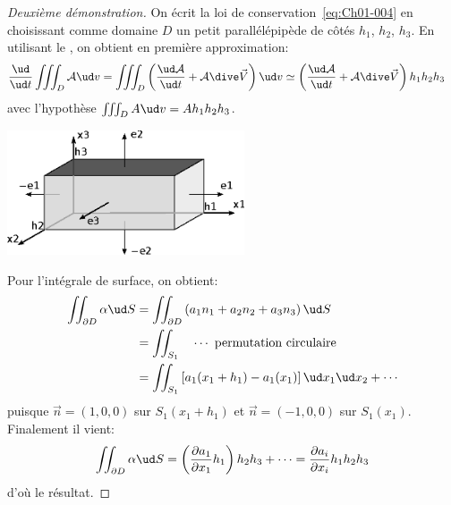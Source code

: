 \begin{proof}[Deuxième démonstration]
    On écrit la loi de conservation~\eqref{eq:Ch01-004} en choisissant comme domaine $D$ un petit parallélépipède de côtés $h_1$, $h_2$, $h_3$.
    En utilisant le , on obtient en première approximation:
    \begin{align*}
        \frac{\ud}{\ud t}\iiint_D \mathcal{A} \ud v &= \iiint_D\left(\frac{\ud \mathcal{A}}{\ud t}+\mathcal{A}\dive \vec{V}\right)\ud v  \simeq \left(\frac{\ud \mathcal{A}}{\ud t}+\mathcal{A}\dive \vec{V}\right) h_1h_2h_3
    \end{align*}
    avec l'hypothèse $\iiint_D A \ud v =A h_1h_2h_3$.

\begin{center}
\includegraphics[width=7cm]{../images/T1_Ch01-0005.eps}
\end{center}

    Pour l'intégrale de surface, on obtient:
    \begin{align*}
        \iint_{\partial D}\alpha \ud S & =\iint_{\partial D}\left(a_1n_1+a_2n_2+a_3n_3\right)\ud S \\
                                       & =\iint_{S_1}\quad \cdots \text{ permutation circulaire}\\
                                       & =\iint_{S_1} \left[a_1(x_1+h_1)-a_1(x_1)\right] \ud x_1 \ud x_2 + \cdots
    \end{align*}
    puisque $\vec{n}= (1,0,0)$ sur $S_1(x_1+h_1)$ et $\vec{n} = (-1,0,0)$ sur $S_1(x_1)$.
    Finalement il vient:
    \begin{equation*}
        \iint_{\partial D}\alpha \ud S=\left(\frac{\partial a_1}{\partial x_1}h_1\right)h_2h_3+\cdots=\frac{\partial a_i}{\partial x_i}h_1 h_2 h_3
    \end{equation*}
    d'où le résultat.
\end{proof}

